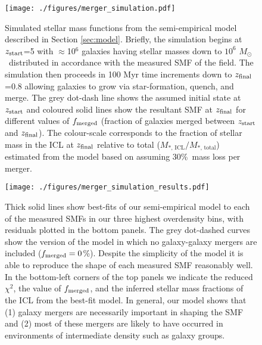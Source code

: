 \documentclass[a4paper,fleqn,usenatbib]{mnras}
\def\msol{$M_{\odot}$}
\begin{document}
\begin{figure}
	\texttt{[image: ./figures/merger\_simulation.pdf]}
	\caption{
	Simulated stellar mass functions from the semi-empirical model described in Section \ref{sec:model}.
	Briefly, the simulation begins at $z_{\rm{start}}$=5 with $\approx$10$^6$ galaxies having stellar masses down to $10^6$ \msol\ distributed in accordance with the measured SMF of the field.
	The simulation then proceeds in 100 Myr time increments down to $z_{\rm{final}}$=0.8 allowing galaxies to grow via star-formation, quench, and merge.
	The grey dot-dash line shows the assumed initial state at $z_{\rm{start}}$ and coloured solid lines show the resultant SMF at $z_{\rm{final}}$ for different values of $f_{\rm{merged}}$ (fraction of galaxies merged between $z_{\rm{start}}$ and $z_{\rm{final}}$).
	The colour-scale corresponds to the fraction of stellar mass in the ICL at $z_{\rm{final}}$ relative to total ($M_{*,\,\mathrm{ICL}} / M_{*,\,\mathrm{total}}$) estimated from the model based on assuming 30\%\ mass loss per merger.
	}
	\label{fig:merger_simulation}
\end{figure}


\begin{figure*}
	\texttt{[image: ./figures/merger\_simulation\_results.pdf]}
	\caption{
	Thick solid lines show best-fits of our semi-empirical model to each of the measured SMFs in our three highest overdensity bins, with residuals plotted in the bottom panels.
	The grey dot-dashed curves show the version of the model in which no galaxy-galaxy mergers are included ($f_{\rm{merged}} = 0$\%).
	Despite the simplicity of the model it is able to reproduce the shape of each measured SMF reasonably well.
	In the bottom-left corners of the top panels we indicate the reduced $\chi^2$, the value of $f_{\rm{merged}}$, and the inferred stellar mass fractions of the ICL from the best-fit model.
	In general, our model shows that (1) galaxy mergers are necessarily important in shaping the SMF and (2) most of these mergers are likely to have occurred in environments of intermediate density such as galaxy groups.
	}
	\label{fig:merger_simulation_results}
\end{figure*}
\end{document}
